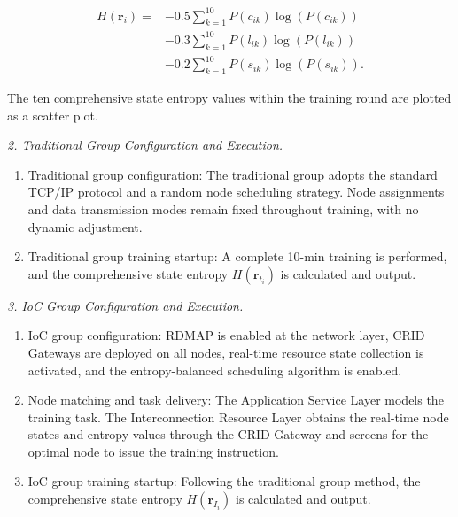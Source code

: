 \documentclass{ccjnl}
\begin{document}
\begin{equation}
	\begin{aligned}
		H(\mathbf{r}_i)
		={}&-0.5\sum_{k=1}^{10}P(c_{ik})\log\!\left(P(c_{ik})\right)\\
		&-0.3\sum_{k=1}^{10}P(l_{ik})\log\!\left(P(l_{ik})\right)\\
		&-0.2\sum_{k=1}^{10}P(s_{ik})\log\!\left(P(s_{ik})\right).
	\end{aligned}
	\label{eq:training-state-entropy}
\end{equation}

The ten comprehensive state entropy values within the training round are plotted as a scatter plot.

\par
{}
\noindent\textit{2. Traditional Group Configuration and Execution.}\par

\begin{enumerate}[nosep,label=\alph*.]
	\item Traditional group configuration:
	The traditional group adopts the standard TCP/IP protocol and a random node scheduling strategy. Node assignments and data transmission modes remain fixed throughout training, with no dynamic adjustment.
	
	\item Traditional group training startup:
	A complete 10-min training is performed, and the comprehensive state entropy $H(\mathbf{r}_{t_i})$ is calculated and output.
\end{enumerate}

\par
{}
\noindent\textit{3. IoC Group Configuration and Execution.}\par

\begin{enumerate}[nosep,label=\alph*.]
	\item IoC group configuration:
	RDMAP is enabled at the network layer, CRID Gateways are deployed on all nodes, real-time resource state collection is activated, and the entropy-balanced scheduling algorithm is enabled.
	
	\item Node matching and task delivery:
	The Application Service Layer models the training task. The Interconnection Resource Layer obtains the real-time node states and entropy values through the CRID Gateway and screens for the optimal node to issue the training instruction.
	
	\item IoC group training startup:
	Following the traditional group method, the comprehensive state entropy $H(\mathbf{r}_{I_i})$ is calculated and output.
\end{enumerate}
\end{document}
